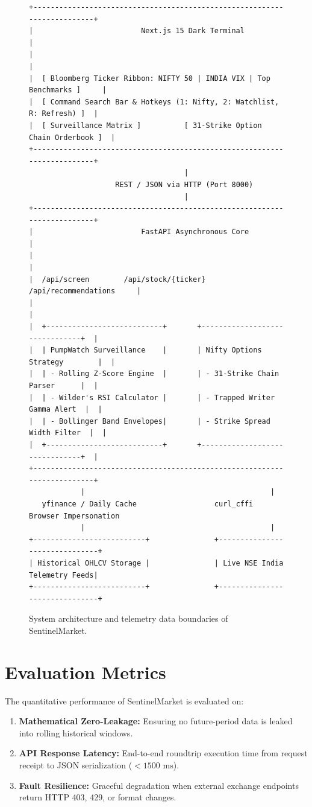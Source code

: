 \begin{figure}[H]
\centering
\begin{verbatim}
+-------------------------------------------------------------------------+
|                         Next.js 15 Dark Terminal                        |
|                                                                         |
|  [ Bloomberg Ticker Ribbon: NIFTY 50 | INDIA VIX | Top Benchmarks ]     |
|  [ Command Search Bar & Hotkeys (1: Nifty, 2: Watchlist, R: Refresh) ]  |
|  [ Surveillance Matrix ]          [ 31-Strike Option Chain Orderbook ]  |
+-------------------------------------------------------------------------+
                                    |
                    REST / JSON via HTTP (Port 8000)
                                    |
+-------------------------------------------------------------------------+
|                         FastAPI Asynchronous Core                       |
|                                                                         |
|  /api/screen        /api/stock/{ticker}        /api/recommendations     |
|                                                                         |
|  +---------------------------+       +-------------------------------+  |
|  | PumpWatch Surveillance    |       | Nifty Options Strategy        |  |
|  | - Rolling Z-Score Engine  |       | - 31-Strike Chain Parser      |  |
|  | - Wilder's RSI Calculator |       | - Trapped Writer Gamma Alert  |  |
|  | - Bollinger Band Envelopes|       | - Strike Spread Width Filter  |  |
|  +---------------------------+       +-------------------------------+  |
+-------------------------------------------------------------------------+
            |                                           |
   yfinance / Daily Cache                  curl_cffi Browser Impersonation
            |                                           |
+--------------------------+               +-------------------------------+
| Historical OHLCV Storage |               | Live NSE India Telemetry Feeds|
+--------------------------+               +-------------------------------+
\end{verbatim}
\caption{System architecture and telemetry data boundaries of SentinelMarket.}
\label{fig:sys_arch}
\end{figure}

\section{Evaluation Metrics}
The quantitative performance of SentinelMarket is evaluated on:
\begin{enumerate}
    \item \textbf{Mathematical Zero-Leakage:} Ensuring no future-period data is leaked into rolling historical windows.
    \item \textbf{API Response Latency:} End-to-end roundtrip execution time from request receipt to JSON serialization ($<1500\text{ ms}$).
    \item \textbf{Fault Resilience:} Graceful degradation when external exchange endpoints return HTTP 403, 429, or format changes.
\end{enumerate}
